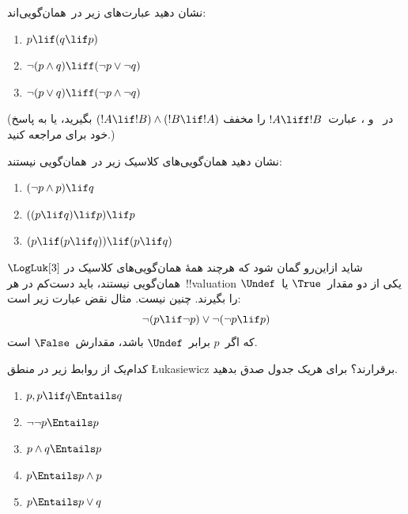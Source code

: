 \documentclass[../../../include/open-logic-section]{subfiles}
\begin{document}
\begin{prob}
  نشان دهید عبارت‌های زیر در~\LogLuk[3] همان‌گویی‌اند:
  \begin{enumerate}
    \item $p \lif (q \lif p)$
    \item\label{mvl:thr:luk:prob:luk-taut-2} $\lnot(p \land q) \liff (\lnot p \lor \lnot q)$
    \item\label{mvl:thr:luk:prob:luk-taut-3} $\lnot(p \lor q) \liff (\lnot p \land \lnot q)$
  \end{enumerate}
  (در~ و
  ، عبارت~$!A \liff !B$ را مخفف
  $(!A \lif !B) \land (!B \lif !A)$ بگیرید، یا به پاسخ خود برای
   مراجعه کنید.)
\end{prob}

\begin{prob}
  نشان دهید همان‌گویی‌های کلاسیک زیر در~\LogLuk[3] همان‌گویی نیستند:
  \begin{enumerate}
    \item $(\lnot p \land p) \lif q$
    \item $((p \lif q) \lif p) \lif p$
    \item $(p \lif (p \lif q)) \lif (p \lif q)$
  \end{enumerate}
\end{prob}

شاید ازاین‌رو گمان شود که هرچند همهٔ همان‌گویی‌های کلاسیک در
$\LogLuk[3]$ همان‌گویی نیستند، باید دست‌کم در هر~!!{valuation} یکی از
دو مقدار~$\True$ یا~$\Undef$ را بگیرند. چنین نیست. مثال نقض عبارت زیر
است:
\[
  \lnot(p \lif \lnot p) \lor \lnot(\lnot p \lif p)
\]
که اگر~$p$ برابر~$\Undef$ باشد، مقدارش~$\False$ است.

\begin{prob}
  کدام‌یک از روابط زیر در منطق \L ukasiewicz برقرارند؟ برای هریک جدول
  صدق بدهید.
  \begin{enumerate}
    \item $p, p \lif q \Entails q$
    \item $\lnot\lnot p \Entails p$
    \item $p \land q \Entails p$
    \item $p \Entails p \land p$
    \item $p \Entails p \lor q$
  \end{enumerate}
\end{prob}
\end{document}
